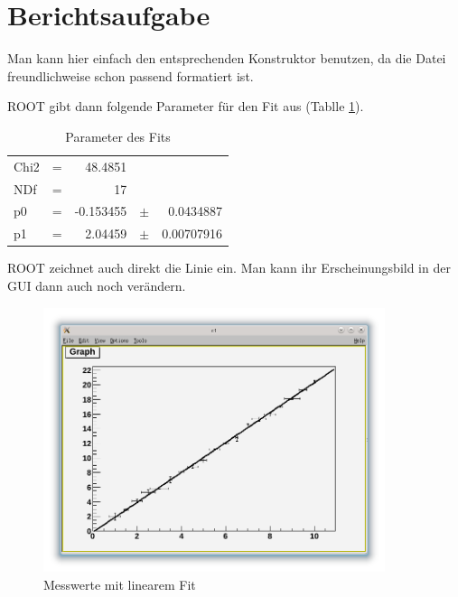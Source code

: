 \section{Berichtsaufgabe}

Man kann hier einfach den entsprechenden Konstruktor benutzen, da die Datei freundlichweise schon passend formatiert ist.


ROOT gibt dann folgende Parameter für den Fit aus (Tablle \ref{table:fit}).

\begin{table}[h]
\begin{center}
\begin{tabular}{lcrcr}
Chi2 & = & 48.4851 &  \\ 
NDf & = & 17 &  \\ 
p0 & = & -0.153455 & $\pm$ & 0.0434887 \\ 
p1 & = & 2.04459 & $\pm$ & 0.00707916 \\ 
\end{tabular} 
\caption{Parameter des Fits}
\label{table:fit}
\end{center}
\end{table}

ROOT zeichnet auch direkt die Linie ein. Man kann ihr Erscheinungsbild in der GUI dann auch noch verändern.


\begin{figure}[h]
\begin{center}
\includegraphics[width=10cm]{Uebung_10/fit.png}
\caption{Messwerte mit linearem Fit}
\end{center}
\end{figure}